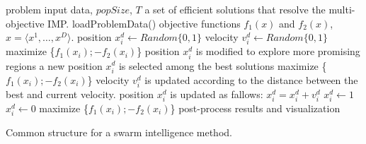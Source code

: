 \documentclass[final,5p,times,twocolumn]{elsarticle}
\begin{document}
\begin{algorithm}[!ht]
    \begin{algorithmic}[1]
        \REQUIRE problem input data, $popSize$, $T$
        \ENSURE a set of efficient solutions that resolve the multi-objective IMP.
        \STATE loadProblemData()
        \STATE {}
        \STATE objective functions $f_{1}(x)$ and $f_{2}(x)$, $x=\langle x^{1},\ldots,x^{D} \rangle$. 
        \STATE {}
                \STATE position $x_{i}^{d} \leftarrow Random\{0,1\}$
                \STATE velocity $v_{i}^{d} \leftarrow Random\{0,1\}$
            \ENDFOR
            \STATE maximize \{$f_{1}(x_{i});-f_{2}(x_{i})$\}
        \ENDFOR
        \STATE {}
                    \STATE position $x_{i}^{d}$ is modified to explore more promising regions
                \ENDIF
                    \STATE a new position $x_{i}^{d}$ is selected among the best solutions
                \ENDIF
                \STATE maximize \{$f_{1}(x_{i});-f_{2}(x_{i})$\}
            \ENDFOR
                    \STATE {}
                    \STATE velocity $v_{i}^{d}$ is updated according to the distance between the best and current velocity.
                    \STATE position $x_{i}^{d}$ is updated as fallows: $x_{i}^{d} = x_{i}^{d} + v_{i}^{d}$
                    \STATE {}
                    \IF {$\dfrac{1}{1 + e^{-x_{i}^{d}}} > Random[0,1)$}
                        \STATE $x_{i}^{d} \leftarrow 1$
                    \ELSE
                        \STATE $x_{i}^{d} \leftarrow 0$
                    \ENDIF
                \ENDFOR
                \STATE maximize \{$f_{1}(x_{i});-f_{2}(x_{i})$\}
            \ENDFOR
        \ENDWHILE
        \RETURN post-process results and visualization
    \end{algorithmic}
    \caption{Common structure for a swarm intelligence method.}\label{alg:sim}
\end{algorithm}
\end{document}
